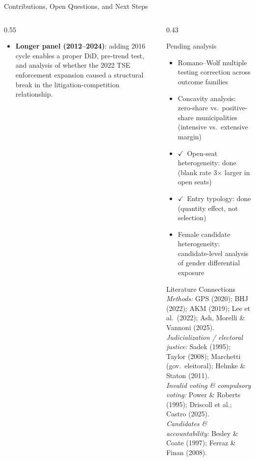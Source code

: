 \documentclass[aspectratio=169,10pt]{beamer}
\newcommand{\tick}{{\color{mygreen}$\checkmark$}}
\begin{document}
\begin{frame}{Contributions, Open Questions, and Next Steps}
\begin{columns}[T]
\begin{column}{0.55\textwidth}
\begin{itemize}
  \item \textbf{Longer panel (2012--2024)}: adding 2016 cycle enables a proper DiD, pre-trend test, and analysis of whether the 2022 TSE enforcement expansion caused a structural break in the litigation-competition relationship.
\end{itemize}
\end{column}
\begin{column}{0.43\textwidth}
\begin{block}{Pending analysis}
  \begin{itemize}
    \item Romano--Wolf multiple testing correction across outcome families
    \item Concavity analysis: zero-share vs.\ positive-share municipalities (intensive vs.\ extensive margin)
    \item \tick~Open-seat heterogeneity: done (blank rate 3$\times$ larger in open seats)
    \item \tick~Entry typology: done (quantity effect, not selection)
    \item Female candidate heterogeneity: candidate-level analysis of gender differential exposure
  \end{itemize}
\end{block}
\begin{block}{Literature Connections}
  \footnotesize
  \textit{Methods:} GPS (2020); BHJ (2022); AKM (2019); Lee et al.\ (2022); Ash, Morelli \& Vannoni (2025).\\[2pt]
  \textit{Judicialization / electoral justice:} Sadek (1995); Taylor (2008); Marchetti (gov.\ eleitoral); Helmke \& Staton (2011).\\[2pt]
  \textit{Invalid voting \& compulsory voting:} Power \& Roberts (1995); Driscoll et al.; Castro (2025).\\[2pt]
  \textit{Candidates \& accountability:} Besley \& Coate (1997); Ferraz \& Finan (2008).
\end{block}
\end{column}
\end{columns}
\end{frame}


\appendix
\end{document}
